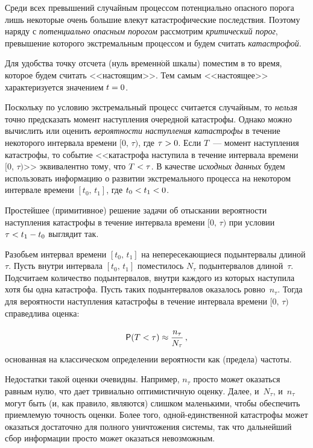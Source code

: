 \begin{multicols}{2}
Среди всех превышений случайным процессом потенциально опасного
порога лишь некоторые очень большие влекут катастрофические
последствия. Поэтому наряду с \textit{потенциально опасным порогом}
рассмотрим \textit{критический порог}, превышение которого
экстремальным процессом и будем считать \textit{катастрофой}.

Для удобства точку отсчета (нуль временн$\acute{\mbox{о}}$й шкалы) поместим в то
время, которое будем считать <<настоящим>>. Тем самым <<настоящее>>
характеризуется значением $t\hm=0$.

Поскольку по условию экстремальный процесс считается случайным, то
\textit{нельзя} точно предсказать момент наступления очередной
катастрофы. Однако можно вычислить или оценить \textit{вероятности
наступления катастрофы} в течение некоторого интервала времени
$[0,\,\tau)$, где $\tau\hm>0$. Если $T$~--- момент наступления
катастрофы, то событие <<катастрофа наступила в течение интервала
времени $[0,\,\tau)$>> эквивалентно тому, что $T\hm<\tau$. В качестве
\textit{исходных данных} будем использовать информацию о развитии
экстремального процесса на некотором интервале времени
$[t_0,\,t_1]$, где $t_0\hm<t_1\hm<0$.

Простейшее (примитивное) решение задачи об отыскании вероятности
наступления катастрофы в течение интервала времени $[0,\,\tau)$ при
условии $\tau\hm<t_1\hm-t_0$ выглядит так.

Разобьем интервал времени $[t_0,\,t_1]$ на непересекающиеся
подынтервалы длиной $\tau$. Пусть внутри интервала $[t_0,\,t_1]$
поместилось $N_{\tau}$ подынтервалов длиной~$\tau$. Подсчитаем
количество подынтервалов, внутри каждого из которых наступила хотя
бы одна катастрофа. Пусть таких подынтервалов оказалось ровно~$n_{\tau}$. 
Тогда для вероятности наступления катастрофы в течение
интервала времени $[0,\,\tau)$ справедлива оценка: 

\noindent
\begin{equation}
{\sf P}(T<\tau)\approx\displaystyle\frac{\displaystyle n_{\tau}\mathstrut}{\displaystyle N_{\tau}\mathstrut}\,,\label{e1-kor}
\end{equation} 
основанная на
классическом определении вероятности как (предела) частоты.

Недостатки такой оценки очевидны. Например, $n_{\tau}$ просто может
оказаться равным нулю, что дает тривиально оптимистичную оценку.
Далее, и~$N_\tau$, и~$n_\tau$ могут быть (и, как правило, являются)
слишком маленькими, чтобы обеспечить приемлемую точность оценки.
Более того, од\-ной-един\-ст\-вен\-ной катастрофы может оказаться достаточно
для полного уничтожения сис\-те\-мы, так что дальнейший сбор информации
просто может оказаться невозможным.


\end{multicols}
